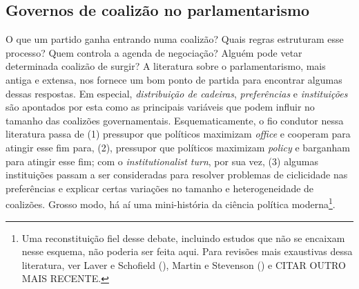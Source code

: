\subsection{Governos de coalizão no parlamentarismo}

O que um partido ganha entrando numa coalizão? Quais regras estruturam esse processo? Quem controla a agenda de negociação? Alguém pode vetar determinada coalizão de surgir? A literatura sobre o parlamentarismo, mais antiga e extensa, nos fornece um bom ponto de partida para encontrar algumas dessas respostas. Em especial, \textit{distribuição de cadeiras}, \textit{preferências} e \textit{instituições} são apontados por esta como as principais variáveis que podem influir no tamanho das coalizões governamentais. Esquematicamente, o fio condutor nessa literatura passa de (1) pressupor que políticos maximizam \textit{office} e cooperam para atingir esse fim para, (2),  pressupor que políticos maximizam \textit{policy} e barganham para atingir esse fim; com o \textit{institutionalist turn}, por sua vez, (3) algumas instituições passam a ser consideradas para resolver problemas de ciclicidade nas preferências e explicar certas variações no tamanho e heterogeneidade de coalizões. Grosso modo, há aí uma mini-história da ciência política moderna\footnote{Uma reconstituição fiel desse debate, incluindo estudos que não se encaixam nesse esquema, não poderia ser feita aqui. Para revisões mais exaustivas dessa literatura, ver Laver e Schofield (\citeyear{laver1998}), Martin e Stevenson (\citeyear{martin2001}) e CITAR OUTRO MAIS RECENTE.}.

